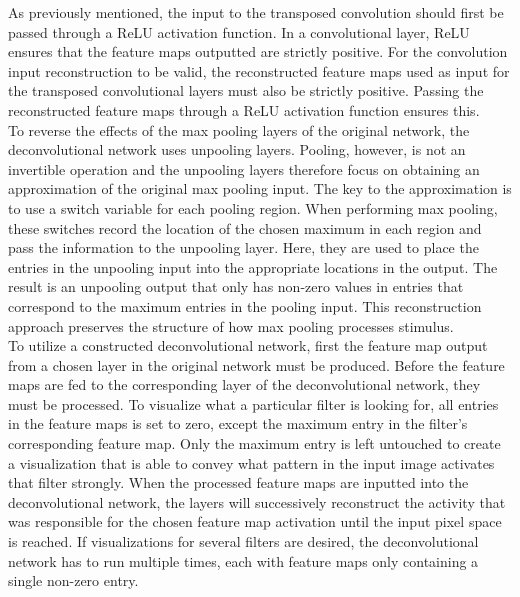 \noindent As previously mentioned, the input to the transposed convolution should first be passed through a ReLU activation function. In a convolutional layer, ReLU ensures that the feature maps outputted are strictly positive. For the convolution input reconstruction to be valid, the reconstructed feature maps used as input for the transposed convolutional layers must also be strictly positive. Passing the reconstructed feature maps through a ReLU activation function ensures this. \\

\noindent To reverse the effects of the max pooling layers of the original network, the deconvolutional network uses unpooling layers. Pooling, however, is not an invertible operation and the unpooling layers therefore focus on obtaining an approximation of the original max pooling input. The key to the approximation is to use a switch variable for each pooling region. When performing max pooling, these switches record the location of the chosen maximum in each region and pass the information to the unpooling layer. Here, they are used to place the entries in the unpooling input into the appropriate locations in the output. The result is an unpooling output that only has non-zero values in entries that correspond to the maximum entries in the pooling input. This reconstruction approach preserves the structure of how max pooling processes stimulus. \\

\noindent To utilize a constructed deconvolutional network, first the feature map output from a chosen layer in the original network must be produced. Before the feature maps are fed to the corresponding layer of the deconvolutional network, they must be processed. To visualize what a particular filter is looking for, all entries in the feature maps is set to zero, except the maximum entry in the filter's corresponding feature map. Only the maximum entry is left untouched to create a visualization that is able to convey what pattern in the input image activates that filter strongly. When the processed feature maps are inputted into the deconvolutional network, the layers will successively reconstruct the activity that was responsible for the chosen feature map activation until the input pixel space is reached. If visualizations for several filters are desired, the deconvolutional network has to run multiple times, each with feature maps only containing a single non-zero entry. \\


